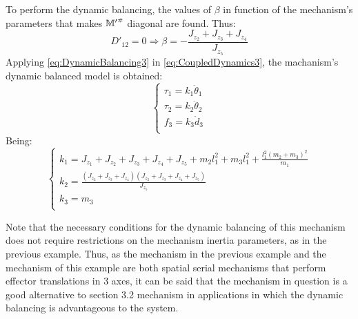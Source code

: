 \documentclass[a4paper,11pt,brazil,fleqn]{article}
\begin{document}
To perform the dynamic balancing, the values of $\beta$ in function of the mechanism's parameters that makes ${\mathbb{M}'}^{\scriptscriptstyle \#}$ diagonal are found. Thus:
\begin{equation}\label{eq:DynamicBalancing3}
D'_{12} = 0 \Rightarrow \beta = -\frac{J_{z_2}+J_{z_3}+J_{z_4}}{J_{z_5}}
\end{equation}
Applying \eqref{eq:DynamicBalancing3} in \eqref{eq:CoupledDynamics3}, the machanism's dynamic balanced model is obtained: 
\begin{equation}\label{eq:DynamicBalanced3}
\begin{cases}
\tau_1 = k_1 \ddot{\theta}_1 \\
\tau_2 = k_2 \ddot{\theta}_2 \\
f_3 = k_3 \ddot{d}_3 \\
\end{cases}
\end{equation}
Being:
\begin{equation}\label{eq:DynamicBalancedKs3}
\begin{cases}
k_1 = J_{z_1} + J_{z_2} + J_{z_3} + J_{z_4} + J_{z_5} + m_2 l_1^2 + m_3 l_1^2 + \frac{l_1^2 (m_2 + m_3)^2}{m_1} \\
k_2 = \frac{(J_{z_2}+J_{z_3}+J_{z_4})(J_{z_2}+J_{z_3}+J_{z_4}+J_{z_5})}{J_{z_5}} \\
k_3 = m_3 \\
\end{cases}
\end{equation}

Note that the necessary conditions for the dynamic balancing of this mechanism does not require restrictions on the mechanism inertia parameters, as in the previous example. Thus, as the mechanism in the previous example and the mechanism of this example are both spatial serial mechanisms that perform effector translations in 3 axes, it can be said that the mechanism in question is a good alternative to section 3.2 mechanism in applications in which the dynamic balancing is advantageous to the system.
\end{document}
